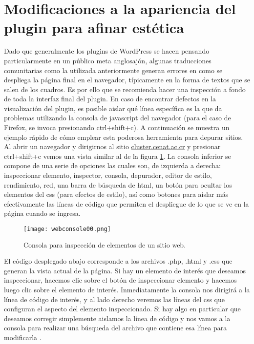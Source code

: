 \section{Modificaciones a la apariencia del plugin para afinar estética}
Dado que generalmente los plugins de WordPress  se hacen pensando particularmente en un público meta anglosajón, algunas traducciones comunitarias como la utilizada anteriormente generan errores en como se despliega la página final en el navegador, típicamente en la forma de textos que se salen de los cuadros. Es por ello que se recomienda hacer una inspección a fondo de toda la interfaz final del plugin. En caso de encontrar defectos en la visualización del plugin,  es posible aislar qué línea específica es la que da problemas utilizando la consola de javascript del navegador (para el caso de Firefox, se invoca presionando ctrl+shift+c). A continuación se muestra un ejemplo rápido de cómo emplear esta poderosa herramienta para depurar sitios. Al abrir un navegador y dirigirnos al sitio \url{cluster.cenat.ac.cr} y presionar ctrl+shift+c vemos una vista similar al de la figura \ref{fig:js:20}. La consola inferior se compone de una serie de opciones las cuales son, de izquierda a derecha: inspeccionar elemento, inspector,  consola, depurador, editor  de estilo, rendimiento, red, una barra de búsqueda de html, un botón para ocultar los elementos del css (para efectos de estilo), así como botones para aislar más efectivamente las líneas de código que permiten el despliegue de lo que se ve en la página cuando se ingresa.
\begin{figure}[H]
\centering
\texttt{[image: webconsole00.png]}
\caption{Consola para inspección de elementos de un sitio web.}
\label{fig:js:20}
\end{figure}
El  código desplegado abajo corresponde a los  archivos .php, .html y .css que generan la vista actual de la página. Si hay un elemento de interés  que deseamos inspeccionar, hacemos clic  sobre el botón de inspeccionar elemento y hacemos luego clic sobre el elemento de interés. Inmediatamente la  consola nos dirigirá a la línea de código de interés, y al lado derecho veremos las líneas del css que configuran el aspecto del elemento inspeccionado. Si hay algo en particular que deseamos corregir simplemente aislamos la línea de código y nos vamos a la consola para realizar una búsqueda del archivo que contiene esa línea para modificarla \cite{textinfile}.

